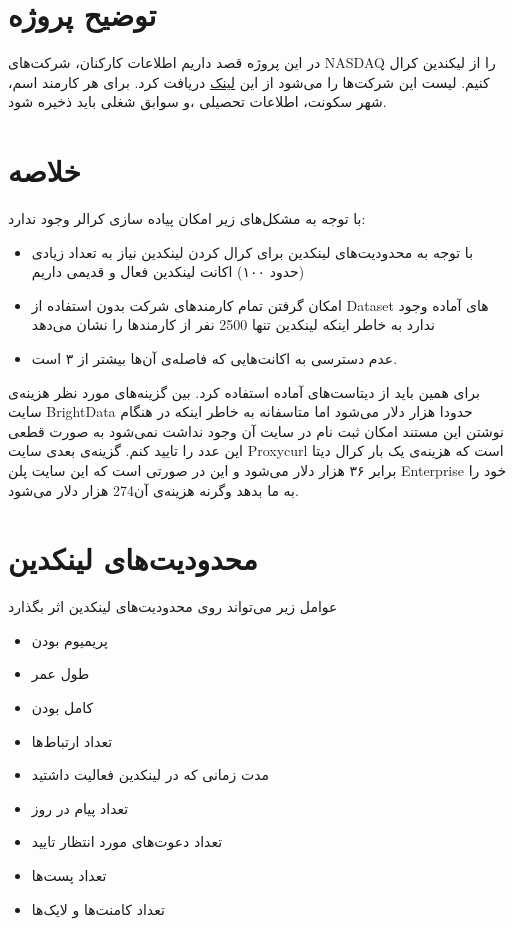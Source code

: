 \section{توضیح پروژه}
در این پروژه قصد داریم اطلاعات کارکنان، شرکت‌های NASDAQ را از لیکندین کرال کنیم. 
لیست این شرکت‌ها را می‌شود از این 
\href{https://www.nasdaq.com/market-activity/stocks/screener}{لینک}
دریافت کرد. برای هر کارمند اسم، شهر سکونت، اطلاعات تحصیلی ،و سوابق شغلی باید ذخیره شود.

\section{خلاصه}
با توجه به مشکل‌های زیر امکان پیاده سازی کرالر وجود ندارد:
\begin{itemize}
    \item  با توجه به محدودیت‌های لینکدین برای کرال کردن لینکدین نیاز به تعداد زیادی (حدود ۱۰۰) اکانت لینکدین فعال و قدیمی داریم
    \item امکان گرفتن تمام کارمند‌های شرکت بدون استفاده از Dataset های آماده وجود ندارد به خاطر اینکه لینکدین تنها 2500 نفر از کارمند‌ها را نشان می‌دهد
    \item عدم دسترسی به اکانت‌هایی که فاصله‌ی آن‌ها بیشتر از ۳ است.
\end{itemize}
برای همین باید از دیتاست‌های آماده استفاده کرد. بین گزینه‌های مورد نظر هزینه‌ی سایت BrightData حدودا هزار دلار می‌شود اما متاسفانه به خاطر اینکه در هنگام نوشتن این مستند امکان ثبت نام در سایت آن وجود نداشت نمی‌شود به صورت قطعی این عدد را تایید کنم. گزینه‌ی بعدی سایت Proxycurl است که هزینه‌ی یک بار کرال دیتا برابر ۳۶ هزار دلار می‌شود و این در صورتی است که این سایت پلن Enterprise خود را به ما بدهد وگرنه هزینه‌ی آن274 هزار دلار می‌شود.



\section{محدودیت‌های لینکدین}
عوامل زیر می‌تواند روی محدودیت‌های لینکدین اثر بگذارد
\begin{itemize}
    \item پریمیوم بودن 
    \item طول عمر 
    \item کامل بودن
    \item تعداد ارتباط‌ها
    \item مدت زمانی که در لینکدین فعالیت داشتید
    \item تعداد پیام در روز
    \item تعداد دعوت‌های مورد انتظار تایید
    \item تعداد پست‌ها
    \item تعداد کامنت‌ها و لایک‌ها
\end{itemize}

